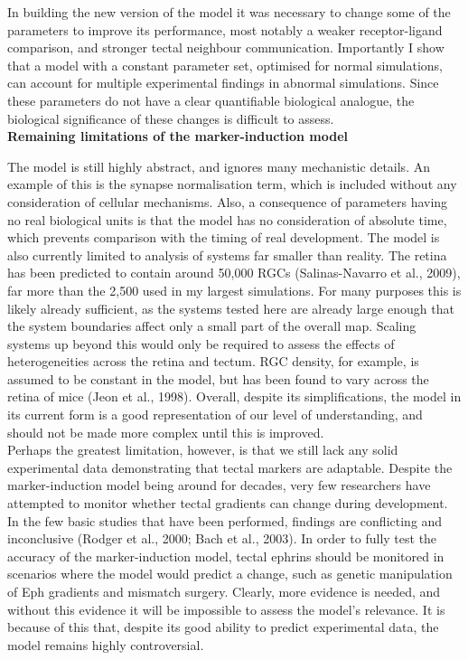 \documentclass[11pt]{"article"}
\begin{document}
\pagebreak

In building the new version of the model it was necessary to change some of the parameters to improve its performance, most notably a weaker receptor-ligand comparison, and stronger tectal neighbour communication. Importantly I show that a model with a constant parameter set, optimised for normal simulations, can account for multiple experimental findings in abnormal simulations. Since these parameters do not have a clear quantifiable biological analogue, the biological significance of these changes is difficult to assess.
\\


\textbf{Remaining limitations of the marker-induction model}

The model is still highly abstract, and ignores many mechanistic details. An example of this is the synapse normalisation term, which is included without any consideration of cellular mechanisms. Also, a consequence of parameters having no real biological units is that the model has no consideration of absolute time, which prevents comparison with the timing of real development. The model is also currently limited to analysis of systems far smaller than reality. The retina has been predicted to contain around 50,000 RGCs (Salinas-Navarro et al., 2009), far more than the 2,500 used in my largest simulations. For many purposes this is likely already sufficient, as the systems tested here are already large enough that the system boundaries affect only a small part of the overall map. Scaling systems up beyond this would only be required to assess the effects of heterogeneities across the retina and tectum. RGC density, for example, is assumed to be constant in the model, but has been found to vary across the retina of mice (Jeon et al., 1998). Overall, despite its simplifications, the model in its current form is a good representation of our level of understanding, and should not be made more complex until this is improved. \\

Perhaps the greatest limitation, however, is that we still lack any solid experimental data demonstrating that tectal markers are adaptable. Despite the marker-induction model being around for decades, very few researchers have attempted to monitor whether tectal gradients can change during development. In the few basic studies that have been performed, findings are conflicting and inconclusive (Rodger et al., 2000; Bach et al., 2003). In order to fully test the accuracy of the marker-induction model, tectal ephrins should be monitored in scenarios where the model would predict a change, such as genetic manipulation of Eph gradients and mismatch surgery. Clearly, more evidence is needed, and without this evidence it will be impossible to assess the model's relevance. It is because of this that, despite its good ability to predict experimental data, the model remains highly controversial. \\
\end{document}
